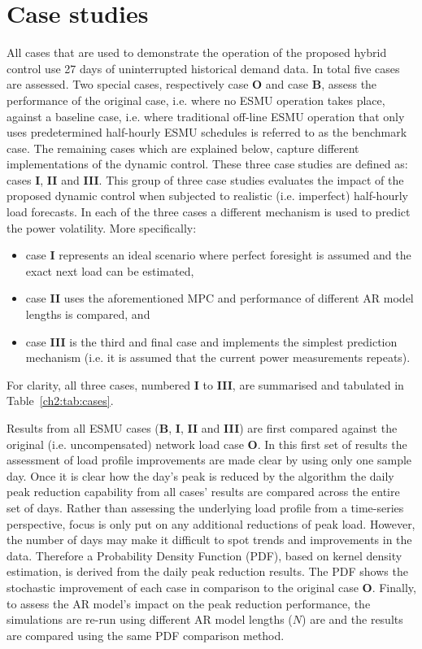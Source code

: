\section{Case studies}
\label{ch2:sec:case-studies}

All cases that are used to demonstrate the operation of the proposed hybrid control use 27 days of uninterrupted historical demand data.
In total five cases are assessed.
Two special cases, respectively case \textbf{O} and case \textbf{B}, assess the performance of the original case, i.e. where no ESMU operation takes place, against a baseline case, i.e.  where traditional off-line ESMU operation that only uses predetermined half-hourly ESMU schedules is referred to as the benchmark case.
The remaining cases which are explained below, capture different implementations of the dynamic control.
These three case studies are defined as: cases \textbf{I}, \textbf{II} and \textbf{III}.
This group of three case studies evaluates the impact of the proposed dynamic control when subjected to realistic (i.e. imperfect) half-hourly load forecasts.
In each of the three cases a different mechanism is used to predict the power volatility.
More specifically:
\begin{itemize}
	\item case \textbf{I} represents an ideal scenario where perfect foresight is assumed and the exact next load can be estimated,
	\item case \textbf{II} uses the aforementioned MPC and performance of different AR model lengths is compared, and
	\item case \textbf{III} is the third and final case and implements the simplest prediction mechanism (i.e. it is assumed that the current power measurements repeats).
\end{itemize}
For clarity, all three cases, numbered \textbf{I} to \textbf{III}, are summarised and tabulated in Table~\ref{ch2:tab:cases}.



Results from all ESMU cases (\textbf{B}, \textbf{I}, \textbf{II} and \textbf{III}) are first compared against the original (i.e. uncompensated) network load case \textbf{O}.
In this first set of results the assessment of load profile improvements are made clear by using only one sample day.
Once it is clear how the day's peak is reduced by the algorithm the daily peak reduction capability from all cases' results are compared across the entire set of days.
Rather than assessing the underlying load profile from a time-series perspective, focus is only put on any additional reductions of peak load.
However, the number of days may make it difficult to spot trends and improvements in the data.
Therefore a Probability Density Function (PDF), based on kernel density estimation, is derived from the daily peak reduction results.
The PDF shows the stochastic improvement of each case in comparison to the original case \textbf{O}.
Finally, to assess the AR model's impact on the peak reduction performance, the simulations are re-run using different AR model lengths ($N$) are and the results are compared using the same PDF comparison method.
